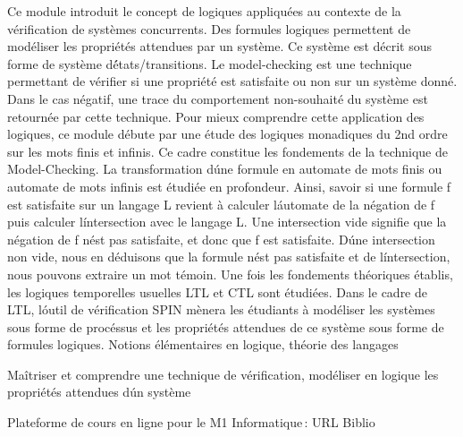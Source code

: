 {
Ce module introduit le concept de logiques appliquées au contexte de la vérification de systèmes concurrents. Des formules logiques permettent de modéliser les propriétés attendues par un système. Ce système est décrit sous forme de système d\'états/transitions. Le model-checking est une technique permettant de vérifier si une propriété est satisfaite ou non sur un système donné. Dans le cas négatif, une trace du comportement non-souhaité du système est retournée par cette technique. Pour mieux comprendre cette application des logiques, ce module débute par une étude des logiques monadiques du 2nd ordre sur les mots finis et infinis. Ce cadre constitue les fondements de la technique de Model-Checking. La transformation d\'une formule en automate de mots finis ou automate de mots infinis est étudiée en profondeur. Ainsi, savoir si une formule f est satisfaite sur un langage L revient à calculer l\'automate de la négation de f puis calculer l\'intersection avec le langage L. Une intersection vide signifie que la négation de f n\'est pas satisfaite, et donc que f est satisfaite. D\'une intersection non vide, nous en déduisons que la formule n\'est pas satisfaite et de l\'intersection, nous pouvons extraire un mot témoin. Une fois les fondements théoriques établis, les logiques temporelles usuelles LTL et CTL sont étudiées. Dans le cadre de LTL, l\'outil de vérification SPIN mènera les étudiants à modéliser les systèmes sous forme de procéssus et les propriétés attendues de ce système sous forme de formules logiques.
} 
{Notions élémentaires en logique, théorie des langages 
} 
{
\begin{itemize}\ObjItem Maîtriser et comprendre une technique de vérification,
 \ObjItem modéliser en logique les propriétés attendues d\'un système 
 \end{itemize} 
} 
{Plateforme de cours en ligne pour le M1 Informatique\,: URL} 
{Biblio} 
 
